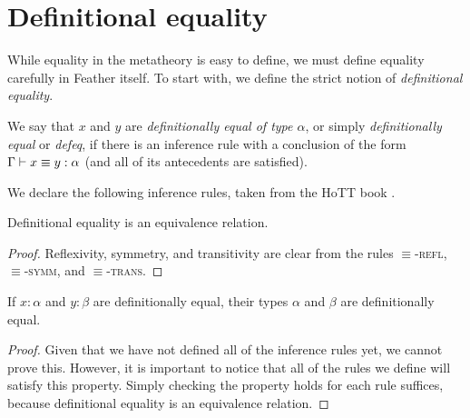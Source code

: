 \section{Definitional equality}
While equality in the metatheory is easy to define, we must define equality carefully in Feather itself.
To start with, we define the strict notion of \textit{definitional equality}.
\begin{defn}
	We say that \( x \) and \( y \) are \textit{definitionally equal of type \( \alpha \)}, or simply \textit{definitionally equal} or \textit{defeq}, if there is an inference rule with a conclusion of the form \( \Gamma \vdash x \equiv y : \alpha \) (and all of its antecedents are satisfied).
\end{defn}
We declare the following inference rules, taken from the HoTT book \cite{hottbook}.
\begin{lem}
	Definitional equality is an equivalence relation.
\end{lem}
\begin{proof}
	Reflexivity, symmetry, and transitivity are clear from the rules \( \equiv \)-\textsc{refl}, \( \equiv \)-\textsc{symm}, and \( \equiv \)-\textsc{trans}.
\end{proof}
\begin{lem}
	If \( x : \alpha \) and \( y : \beta \) are definitionally equal, their types \( \alpha \) and \( \beta \) are definitionally equal.
\end{lem}
\begin{proof}
	Given that we have not defined all of the inference rules yet, we cannot prove this.
	However, it is important to notice that all of the rules we define will satisfy this property.
	Simply checking the property holds for each rule suffices, because definitional equality is an equivalence relation.
\end{proof}
